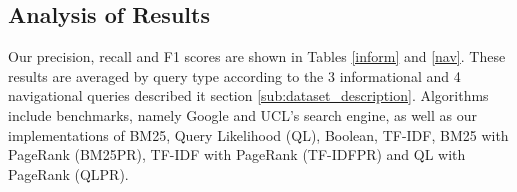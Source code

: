 \begin{table*}[!t]

    \begin{subtable}{.6\textwidth}
    \centering
    \caption{Average ranking time by algorithm}
    \end{subtable}
    \vspace{0.5cm} 
\end{table*}

\subsection{Analysis of Results} %
\label{sub:analysis_of_results}
Our precision, recall and F1 scores are shown in Tables \ref{inform} and \ref{nav}. These results are averaged by query type according to the 3 informational and 4 navigational queries described it section \ref{sub:dataset_description}. Algorithms include benchmarks, namely Google and UCL's search engine, as well as our implementations of BM25, Query Likelihood (QL), Boolean, TF-IDF, BM25 with PageRank (BM25PR), TF-IDF with PageRank (TF-IDFPR) and QL with PageRank (QLPR).

